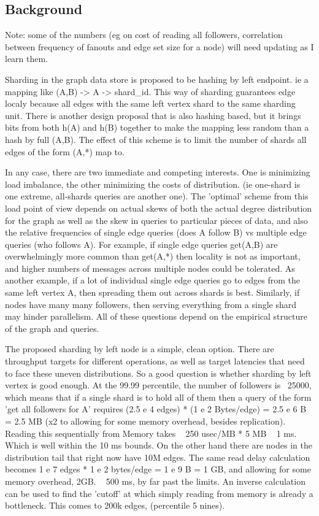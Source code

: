 \documentclass{article}
\begin{document}
\subsection{Background}
Note: some of the numbers (eg on cost of reading all followers, correlation between frequency of fanouts and edge set size for a node) will need updating as I learn them.

Sharding in the graph data store is proposed to be hashing by left endpoint.  ie a mapping like (A,B) -> A -> shard\_id. This way of sharding guarantees edge localy because all edges with the same left vertex shard to the same sharding unit.  There is another design proposal that is also hashing based, but it brings bits from both h(A) and h(B) together to make the mapping less random than a hash by full (A,B). The effect of this scheme is to limit the number of shards all edges of the form (A,*) map to.

In any case, there are two immediate and competing interests. One is minimizing load imbalance, the other minimizing the costs of distribution. (ie one-shard is one extreme, all-shards queries are another one). The 'optimal' scheme from this load point of view depends on actual skews of both the actual degree distribution for the graph as well as the skew in queries to particular pieces of data, and also the relative frequencies of single edge queries (does A follow B) vs multiple edge queries (who follows A).  For example, if single edge queries get(A,B) are overwhelmingly more common than get(A,*) then locality is not as important, and higher numbers of messages across multiple nodes could be tolerated.  As another example, if a lot of individual single edge queries go to edges from the same left vertex A, then spreading them out across shards is best.  Similarly, if nodes have many many followers, then serving everything from a single shard may hinder parallelism. All of these questions depend on the empirical structure of the graph and queries.

The proposed sharding by left node is a simple, clean option. There are throughput targets for different operations, as well as target latencies that need to face these uneven distributions. So a good question is whether sharding by left vertex is good enough. At the 99.99 percentile, the number of followers is ~25000, which means that if a single shard is to hold all of them then a query of the form 'get all followers for A'  requires (2.5 e 4 edges) * (1 e 2 Bytes/edge) = 2.5 e 6 B = 2.5 MB   (x2 to allowing for some memory overhead, besides replication).   Reading this sequentially from Memory takes ~ 250 usec/MB * 5 MB ~ 1 ms. Which is well within the 10 ms bounds.  On the other hand there are nodes in the distribution tail that right now have 10M edges. The same read delay calculation becomes 1 e 7 edges * 1 e 2 bytes/edge = 1 e 9 B = 1 GB, and allowing for some memory overhead, 2GB. ~  500 ms, by far past the limits.  An inverse calculation can be used to find the 'cutoff' at which simply reading from memory is already a bottleneck.  This comes to 200k edges, (percentile 5  nines).
\end{document}
